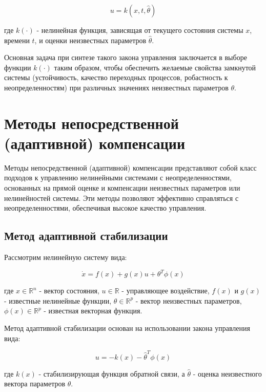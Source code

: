 \documentclass[a4paper,14pt]{extarticle} %
\begin{document}
\begin{equation}
u = k(x, t, \hat{\theta})
\end{equation}

где $k(\cdot)$ - нелинейная функция, зависящая от текущего состояния системы $x$, времени $t$, и оценки неизвестных параметров $\hat{\theta}$.

Основная задача при синтезе такого закона управления заключается в выборе функции $k(\cdot)$ таким образом, чтобы обеспечить желаемые свойства замкнутой системы (устойчивость, качество переходных процессов, робастность к неопределенностям) при различных значениях неизвестных параметров $\theta$.

\section{Методы непосредственной (адаптивной) компенсации}

Методы непосредственной (адаптивной) компенсации представляют собой класс подходов к управлению нелинейными системами с неопределенностями, основанных на прямой оценке и компенсации неизвестных параметров или нелинейностей системы. Эти методы позволяют эффективно справляться с неопределенностями, обеспечивая высокое качество управления.

\subsection{Метод адаптивной стабилизации}

Рассмотрим нелинейную систему вида:

\begin{equation}
\dot{x} = f(x) + g(x)u + \theta^T\phi(x)
\end{equation}

где $x \in \mathbb{R}^n$ - вектор состояния, $u \in \mathbb{R}$ - управляющее воздействие, $f(x)$ и $g(x)$ - известные нелинейные функции, $\theta \in \mathbb{R}^p$ - вектор неизвестных параметров, $\phi(x) \in \mathbb{R}^p$ - известная векторная функция.

Метод адаптивной стабилизации основан на использовании закона управления вида:

\begin{equation}
u = -k(x) - \hat{\theta}^T\phi(x)
\end{equation}

где $k(x)$ - стабилизирующая функция обратной связи, а $\hat{\theta}$ - оценка неизвестного вектора параметров $\theta$.
\end{document}
